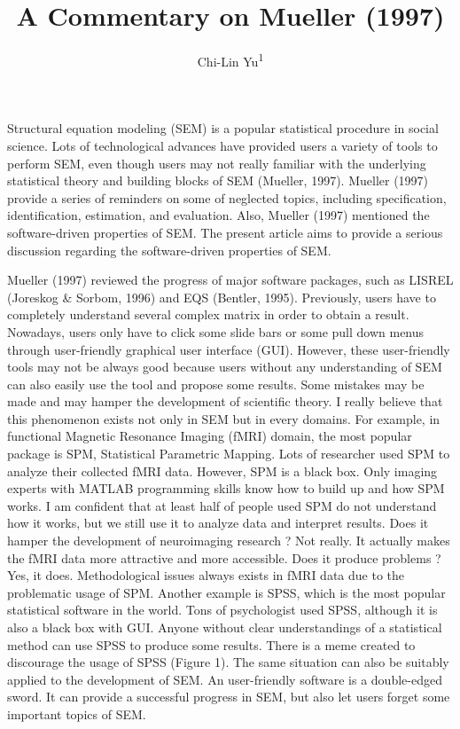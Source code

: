 \documentclass[jou]{apa6}
\title{A Commentary on Mueller (1997)}
\author{Chi-Lin Yu\textsuperscript{1}}
\affiliation{
    \vspace{0.5cm}
          \textsuperscript{1} Department of Psychology, National Taiwan University  }
\theoremstyle{definition}
\theoremstyle{definition}
\theoremstyle{definition}
\theoremstyle{remark}
\begin{document}
\maketitle

\setcounter{secnumdepth}{0}



\setlength{\parindent}{4ex}

Structural equation modeling (SEM) is a popular statistical procedure in
social science. Lots of technological advances have provided users a
variety of tools to perform SEM, even though users may not really
familiar with the underlying statistical theory and building blocks of
SEM (Mueller, 1997). Mueller (1997) provide a series of reminders on
some of neglected topics, including specification, identification,
estimation, and evaluation. Also, Mueller (1997) mentioned the
software-driven properties of SEM. The present article aims to provide a
serious discussion regarding the software-driven properties of SEM.

Mueller (1997) reviewed the progress of major software packages, such as
LISREL (Joreskog \& Sorbom, 1996) and EQS (Bentler, 1995). Previously,
users have to completely understand several complex matrix in order to
obtain a result. Nowadays, users only have to click some slide bars or
some pull down menus through user-friendly graphical user interface
(GUI). However, these user-friendly tools may not be always good because
users without any understanding of SEM can also easily use the tool and
propose some results. Some mistakes may be made and may hamper the
development of scientific theory. I really believe that this phenomenon
exists not only in SEM but in every domains. For example, in functional
Magnetic Resonance Imaging (fMRI) domain, the most popular package is
SPM, Statistical Parametric Mapping. Lots of researcher used SPM to
analyze their collected fMRI data. However, SPM is a black box. Only
imaging experts with MATLAB programming skills know how to build up and
how SPM works. I am confident that at least half of people used SPM do
not understand how it works, but we still use it to analyze data and
interpret results. Does it hamper the development of neuroimaging
research ? Not really. It actually makes the fMRI data more attractive
and more accessible. Does it produce problems ? Yes, it does.
Methodological issues always exists in fMRI data due to the problematic
usage of SPM. Another example is SPSS, which is the most popular
statistical software in the world. Tons of psychologist used SPSS,
although it is also a black box with GUI. Anyone without clear
understandings of a statistical method can use SPSS to produce some
results. There is a meme created to discourage the usage of SPSS (Figure
1). The same situation can also be suitably applied to the development
of SEM. An user-friendly software is a double-edged sword. It can
provide a successful progress in SEM, but also let users forget some
important topics of SEM.
\end{document}
